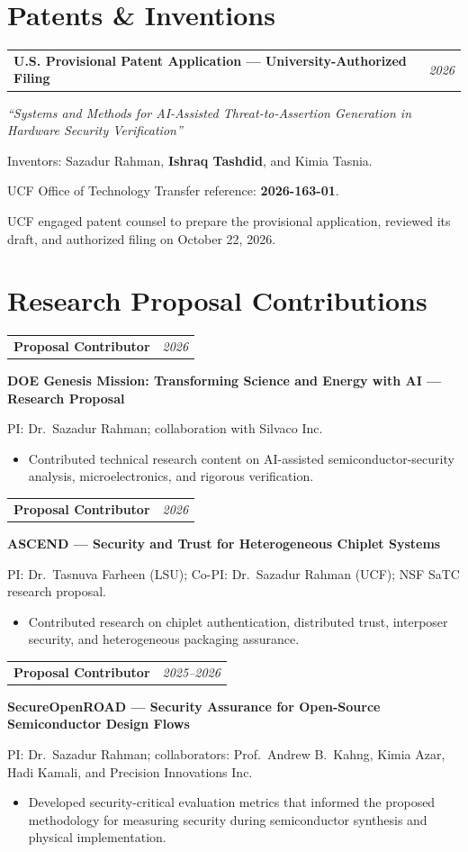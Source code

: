 \documentclass[11pt,letterpaper]{article}
\makeatletter
\newcommand{\entry}[2]{\par\noindent
  \begin{tabularx}{\textwidth}{@{}>{\raggedright\arraybackslash}X@{\hspace{1em}}r@{}}
    #1 & \textit{#2}
  \end{tabularx}\par}
\makeatother
\begin{document}
\section*{Patents \& Inventions}
\entry{\textbf{U.S. Provisional Patent Application --- University-Authorized Filing}}{2026}
\textit{``Systems and Methods for AI-Assisted Threat-to-Assertion Generation in Hardware Security
Verification''}\par
Inventors: Sazadur Rahman, \textbf{Ishraq Tashdid}, and Kimia Tasnia.\par
UCF Office of Technology Transfer reference: \textbf{2026-163-01}.\par
UCF engaged patent counsel to prepare the provisional application, reviewed its draft, and
authorized filing on October 22, 2026.\par

\section*{Research Proposal Contributions}
\entry{\textbf{Proposal Contributor}}{2026}
\textbf{DOE Genesis Mission: Transforming Science and Energy with AI --- Research Proposal}\par
PI: Dr.\ Sazadur Rahman; collaboration with Silvaco Inc.
\begin{itemize}
  \item Contributed technical research content on AI-assisted semiconductor-security analysis,
  microelectronics, and rigorous verification.
\end{itemize}
\vspace{4pt}
\entry{\textbf{Proposal Contributor}}{2026}
\textbf{ASCEND --- Security and Trust for Heterogeneous Chiplet Systems}\par
PI: Dr.\ Tasnuva Farheen (LSU); Co-PI: Dr.\ Sazadur Rahman (UCF); NSF SaTC research proposal.
\begin{itemize}
  \item Contributed research on chiplet authentication, distributed trust, interposer security, and
  heterogeneous packaging assurance.
\end{itemize}
\vspace{4pt}
\entry{\textbf{Proposal Contributor}}{2025--2026}
\textbf{SecureOpenROAD --- Security Assurance for Open-Source Semiconductor Design Flows}\par
PI: Dr.\ Sazadur Rahman; collaborators: Prof.\ Andrew B.\ Kahng, Kimia Azar, Hadi Kamali, and
Precision Innovations Inc.
\begin{itemize}
  \item Developed security-critical evaluation metrics that informed the proposed methodology for
  measuring security during semiconductor synthesis and physical implementation.
\end{itemize}
\end{document}
